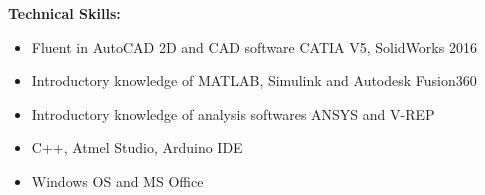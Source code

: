 \documentclass{article}
\begin{document}
\begin{flushleft}
		\medskip
		\textbf{Technical Skills:} 
		\begin{itemize}
			\item Fluent in AutoCAD 2D and CAD software CATIA V5, SolidWorks 2016
			\item Introductory knowledge of MATLAB, Simulink and Autodesk Fusion360
			\item Introductory knowledge of analysis softwares ANSYS and V-REP
			\item C++, Atmel Studio, Arduino IDE
			\item Windows OS and MS Office
		\end{itemize}
		
	\end{flushleft}
\end{document}
